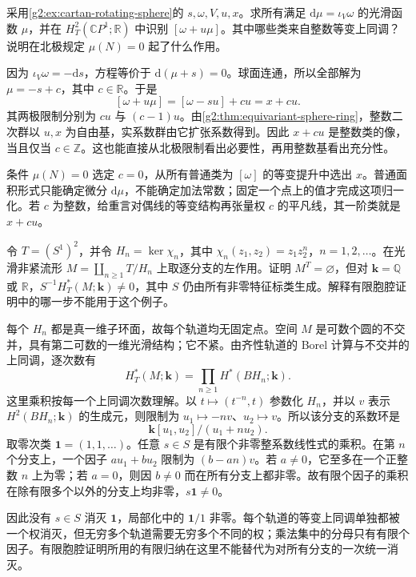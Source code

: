 \begin{exercise}\label{g2:ex:cartan-sphere-lifts}
	采用\cref{g2:ex:cartan-rotating-sphere}的 \(s,\omega,V,u,x\)。求所有满足 \(\mathrm d\mu=\iota_V\omega\) 的光滑函数 \(\mu\)，并在 \(H_T^2(\mathbb CP^1;\mathbb R)\) 中识别 \([\omega+u\mu]\)。其中哪些类来自整数等变上同调？说明在北极规定 \(\mu(N)=0\) 起了什么作用。
\end{exercise}
\begin{solution}
	因为 \(\iota_V\omega=-\mathrm ds\)，方程等价于 \(\mathrm d(\mu+s)=0\)。球面连通，所以全部解为 \(\mu=-s+c\)，其中 \(c\in\mathbb R\)。于是
	\[
		[\omega+u\mu]=[\omega-su]+cu=x+cu.
	\]
	其两极限制分别为 \(cu\) 与 \((c-1)u\)。由\cref{g2:thm:equivariant-sphere-ring}，整数二次群以 \(u,x\) 为自由基，实系数群由它扩张系数得到。因此 \(x+cu\) 是整数类的像，当且仅当 \(c\in\mathbb Z\)。这也能直接从北极限制看出必要性，再用整数基看出充分性。

	条件 \(\mu(N)=0\) 选定 \(c=0\)，从所有普通类为 \([\omega]\) 的等变提升中选出 \(x\)。普通面积形式只能确定微分 \(\mathrm d\mu\)，不能确定加法常数；固定一个点上的值才完成这项归一化。若 \(c\) 为整数，给重言对偶线的等变结构再张量权 \(c\) 的平凡线，其一阶类就是 \(x+cu\)。
\end{solution}

\begin{exercise}\label{g2:ex:localization-noncompact-orbits}
	令 \(T=(S^1)^2\)，并令 \(H_n=\ker\chi_n\)，其中 \(\chi_n(z_1,z_2)=z_1z_2^n\)，\(n=1,2,\ldots\)。在光滑非紧流形 \(M=\coprod_{n\ge1}T/H_n\) 上取逐分支的左作用。证明 \(M^T=\varnothing\)，但对 \(\mathbf k=\mathbb Q\) 或 \(\mathbb R\)，\(S^{-1}H_T^*(M;\mathbf k)\ne0\)，其中 \(S\) 仍由所有非零特征标类生成。解释有限胞腔证明中的哪一步不能用于这个例子。
\end{exercise}
\begin{solution}
	每个 \(H_n\) 都是真一维子环面，故每个轨道均无固定点。空间 \(M\) 是可数个圆的不交并，具有第二可数的一维光滑结构；它不紧。由齐性轨道的 Borel 计算与不交并的上同调，逐次数有
	\[
		H_T^*(M;\mathbf k)=\prod_{n\ge1}H^*(BH_n;\mathbf k).
	\]
	这里乘积按每一个上同调次数理解。以 \(t\mapsto(t^{-n},t)\) 参数化 \(H_n\)，并以 \(v\) 表示 \(H^2(BH_n;\mathbf k)\) 的生成元，则限制为 \(u_1\mapsto-nv\)、\(u_2\mapsto v\)。所以该分支的系数环是
	\[
		\mathbf k[u_1,u_2]/(u_1+nu_2).
	\]
	取零次类 \(\mathbf 1=(1,1,\ldots)\)。任意 \(s\in S\) 是有限个非零整系数线性式的乘积。在第 \(n\) 个分支上，一个因子 \(au_1+bu_2\) 限制为 \((b-an)v\)。若 \(a\ne0\)，它至多在一个正整数 \(n\) 上为零；若 \(a=0\)，则因 \(b\ne0\) 而在所有分支上都非零。故有限个因子的乘积在除有限多个以外的分支上均非零，\(s\mathbf 1\ne0\)。

	因此没有 \(s\in S\) 消灭 \(\mathbf 1\)，局部化中的 \(\mathbf 1/1\) 非零。每个轨道的等变上同调单独都被一个权消灭，但无穷多个轨道需要无穷多个不同的权；乘法集中的分母只有有限个因子。有限胞腔证明所用的有限归纳在这里不能替代为对所有分支的一次统一消灭。
\end{solution}

